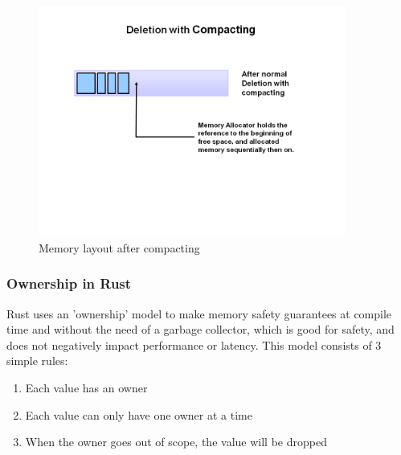 \begin{figure}[htb]
    \centering
    \includegraphics[width=0.9\textwidth]{figures/fundamentals_garbage_collector_compacting.PNG}
    \caption[Illustration: Garbage Collector compacting memory \cite{java_garbage_collector}]{Memory layout after compacting}
    \label{fig:gc_compact}
\end{figure}

\subsubsection{Ownership in Rust}

Rust uses an 'ownership' model \cite{rust_ownership} to make memory safety guarantees at compile time and without the need of a garbage collector,
which is good for safety, and does not negatively impact performance or latency.
This model consists of 3 simple rules:
\begin{enumerate}
    \item Each value has an owner
    \item Each value can only have one owner at a time
    \item When the owner goes out of scope, the value will be dropped
\end{enumerate}

